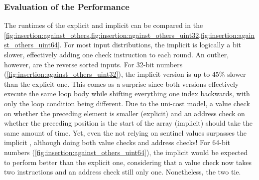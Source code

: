 \subsubsection*{Evaluation of the Performance}
\label{subsubsec:tasklet:insertion:performance}

\def\insertionalgos{1NoSentinel,1,1Implicit,BubbleNonAdapt,BubbleAdapt,Selection}


The runtimes of the explicit and implicit \IS*{} can be compared in the \cref{fig:insertion:against_others,fig:insertion:against_others_uint32,fig:insertion:against_others_uint64}.
For most input distributions, the implicit \IS{} is logically a bit slower, effectively adding one check instruction to each round.
An outlier, however, are the reverse sorted inputs.
For 32-bit numbers (\cref{fig:insertion:against_others_uint32}), the implicit version is up to 45\% slower than the explicit one.
This comes as a surprise since both versions effectively execute the same loop body while shifting everything one index backwards, with only the loop condition being different.
Due to the uni-cost model, a value check on whether the preceding element is smaller (explicit) and an address check on whether the preceding position is the start of the array (implicit) should take the same amount of time.
Yet, even the \IS{} not relying on sentinel values surpasses the implicit \IS{}, although doing both value checks and address checks!
For 64-bit numbers (\cref{fig:insertion:against_others_uint64}), the implicit \IS{} would be expected to perform better than the explicit one, considering that a value check now takes two instructions and an address check still only one.
Nonetheless, the two \IS*{} tie.

